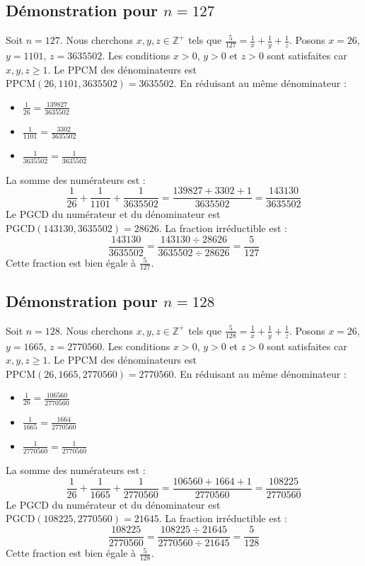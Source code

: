 \documentclass[11pt,a4paper]{article}
\begin{document}
\subsection{Démonstration pour $n = 127$}
Soit $n = 127$. Nous cherchons $x, y, z \in \mathbb{Z}^{+}$ tels que $\frac{5}{127} = \frac{1}{x} + \frac{1}{y} + \frac{1}{z}$.
Posons $x = 26$, $y = 1101$, $z = 3635502$.
Les conditions $x > 0$, $y > 0$ et $z > 0$ sont satisfaites car $x, y, z \geq 1$.
Le PPCM des dénominateurs est $\text{PPCM}(26, 1101, 3635502) = 3635502$.
En réduisant au même dénominateur :
\begin{itemize}
    \item $\frac{1}{26} = \frac{139827}{3635502}$
    \item $\frac{1}{1101} = \frac{3302}{3635502}$
    \item $\frac{1}{3635502} = \frac{1}{3635502}$
\end{itemize}
La somme des numérateurs est :
$$ \frac{1}{26} + \frac{1}{1101} + \frac{1}{3635502} = \frac{139827 + 3302 + 1}{3635502} = \frac{143130}{3635502} $$
Le PGCD du numérateur et du dénominateur est $\text{PGCD}(143130, 3635502) = 28626$.
La fraction irréductible est :
$$ \frac{143130}{3635502} = \frac{143130 \div 28626}{3635502 \div 28626} = \frac{5}{127} $$
Cette fraction est bien égale à $\frac{5}{127}$.

\subsection{Démonstration pour $n = 128$}
Soit $n = 128$. Nous cherchons $x, y, z \in \mathbb{Z}^{+}$ tels que $\frac{5}{128} = \frac{1}{x} + \frac{1}{y} + \frac{1}{z}$.
Posons $x = 26$, $y = 1665$, $z = 2770560$.
Les conditions $x > 0$, $y > 0$ et $z > 0$ sont satisfaites car $x, y, z \geq 1$.
Le PPCM des dénominateurs est $\text{PPCM}(26, 1665, 2770560) = 2770560$.
En réduisant au même dénominateur :
\begin{itemize}
    \item $\frac{1}{26} = \frac{106560}{2770560}$
    \item $\frac{1}{1665} = \frac{1664}{2770560}$
    \item $\frac{1}{2770560} = \frac{1}{2770560}$
\end{itemize}
La somme des numérateurs est :
$$ \frac{1}{26} + \frac{1}{1665} + \frac{1}{2770560} = \frac{106560 + 1664 + 1}{2770560} = \frac{108225}{2770560} $$
Le PGCD du numérateur et du dénominateur est $\text{PGCD}(108225, 2770560) = 21645$.
La fraction irréductible est :
$$ \frac{108225}{2770560} = \frac{108225 \div 21645}{2770560 \div 21645} = \frac{5}{128} $$
Cette fraction est bien égale à $\frac{5}{128}$.
\end{document}
